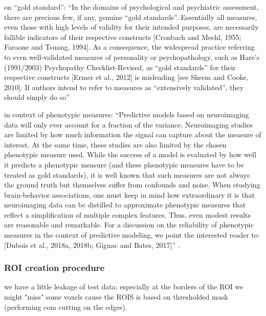 %
\citet{lilienfeld2015fifty} on ``gold standard'': ``In the domains of
psychological and psychiatric assessment, there are precious few, if any,
genuine ``gold standards''. Essentially all measures, even those with high
levels of validity for their intended purposes, are necessarily fallible
indicators of their respective constructs [Cronbach and Meehl, 1955; Faraone and
Tsuang, 1994]. As a consequence, the widespread practice referring to even
well-validated measures of personality or psychopathology, such as Hare’s
(1991/2003) Psychopathy Checklist-Revised, as ``gold standards'' for their
respective constructs [Ermer et al., 2012] is misleading [see Skeem and Cooke,
2010]. If authors intend to refer to measures as ``extensively validated'', they
should simply do so'' \citep{lilienfeld2015fifty}

%
\citet{scheinost2019ten} in context of phenotypic measures: ``Predictive models
based on neuroimaging data will only ever account for a fraction of the
variance. Neuroimaging studies are limited by how much information the signal
can capture about the measure of interest. At the same time, these studies are
also limited by the chosen phenotypic measure used.  While the success of a
model is evaluated by how well it predicts a phenotypic measure (and these
phenotypic measures have to be treated as gold standards), it is well known that
such measures are not always the ground truth but themselves suffer from
confounds and noise.  When studying brain-behavior associations, one must keep
in mind how extraordinary it is that neuroimaging data can be distilled to
approximate phenotypic measures that reflect a simplification of multiple
complex features. Thus, even modest results are reasonable and remarkable. For a
discussion on the reliability of phenotypic measures in the context of
predictive modeling, we point the interested reader to: [Dubois et al., 2018a,
2018b; Gignac and Bates, 2017]'' \citep{scheinost2019ten}.


\subsubsection{ROI creation procedure}

we have a little leakage of test data; especially at the borders of the ROI we
might "miss" some voxels cause the ROIS is based on thresholded mask (performing
com cutting on the edges).



